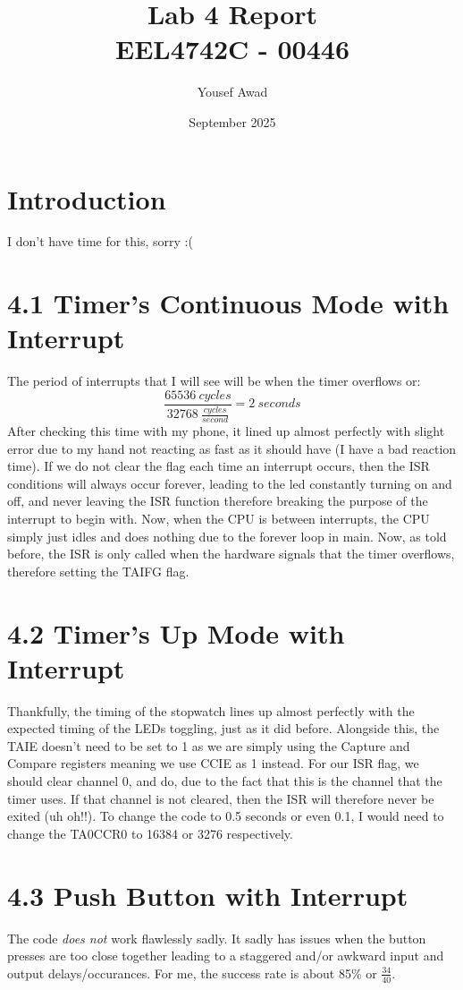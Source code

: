 \documentclass{article}
\title{Lab 4 Report \\ \large EEL4742C - 00446}
\author{Yousef Awad}
\date{September 2025}
\begin{document}
\maketitle
\tableofcontents
\newpage

\section{Introduction}
I don't have time for this, sorry :(

\section{4.1 Timer's Continuous Mode with Interrupt}
The period of interrupts that I will see will be when the timer overflows or:
$$ \frac{65536\ cycles}{32768\ \frac{cycles}{second}} = 2\ seconds $$
After checking this time with my phone, it lined up almost perfectly with slight error due to my hand not reacting as fast as it should have (I have a bad reaction time). If we do not clear the flag each time an interrupt occurs, then the ISR conditions will always occur forever, leading to the led constantly turning on and off, and never leaving the ISR function therefore breaking the purpose of the interrupt to begin with. Now, when the CPU is between interrupts, the CPU simply just idles and does nothing due to the forever loop in main. Now, as told before, the ISR is only called when the hardware signals that the timer overflows, therefore setting the TAIFG flag.


\section{4.2 Timer’s Up Mode with Interrupt}
Thankfully, the timing of the stopwatch lines up almost perfectly with the expected timing of the LEDs toggling, just as it did before. Alongside this, the TAIE doesn't need to be set to 1 as we are simply using the Capture and Compare registers meaning we use CCIE as 1 instead. For our ISR flag, we should clear channel 0, and do, due to the fact that this is the channel that the timer uses. If that channel is not cleared, then the ISR will therefore never be exited (uh oh!!). To change the code to 0.5 seconds or even 0.1, I would need to change the TA0CCR0 to 16384 or 3276 respectively.


\section{4.3 Push Button with Interrupt}
The code \textit{does not} work flawlessly sadly. It sadly has issues when the button presses are too close together leading to a staggered and/or awkward input and output delays/occurances. For me, the success rate is about 85\% or $\frac{34}{40}$.

\end{document}
